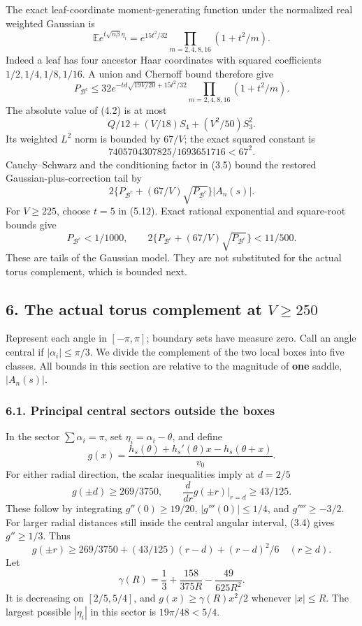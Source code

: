 \documentclass[
  11pt,
]{article}
\begin{document}
The exact leaf-coordinate moment-generating function under the
normalized real weighted Gaussian is \[
 \mathbb E e^{t\sqrt{n\beta}\eta_i}
 =e^{15t^2/32}\prod_{m=2,4,8,16}(1+t^2/m).                    \tag{5.11}
\] Indeed a leaf has four ancestor Haar coordinates with squared
coefficients \(1/2,1/4,1/8,1/16\). A union and Chernoff bound therefore
give \[
 P_{\mathcal B^c}\le32
 e^{-td\sqrt{19V/20}+15t^2/32}
 \prod_{m=2,4,8,16}(1+t^2/m).                                \tag{5.12}
\] The absolute value of (4.2) is at most \[
 Q/12+(V/18)S_4+(V^2/50)S_3^2.
\] Its weighted \(L^2\) norm is bounded by \(67/V\); the exact squared
constant is \[7405704307825/1693651716<67^2.\] Cauchy--Schwarz and the
conditioning factor in (3.5) bound the restored Gaussian-plus-correction
tail by \[
 2\{P_{\mathcal B^c}+(67/V)\sqrt{P_{\mathcal B^c}}\}|A_n(s)|.
\] For \(V\ge225\), choose \(t=5\) in (5.12). Exact rational exponential
and square-root bounds give \[
 P_{\mathcal B^c}<1/1000,\qquad
 2\{P_{\mathcal B^c}+(67/V)\sqrt{P_{\mathcal B^c}}\}<11/500.
                                                               \tag{5.13}
\] These are tails of the Gaussian model. They are not substituted for
the actual torus complement, which is bounded next.

\subsection{\texorpdfstring{6. The actual torus complement at
\(V\ge250\)}{6. The actual torus complement at V\textbackslash ge250}}\label{the-actual-torus-complement-at-vge250}

Represent each angle in \([-\pi,\pi]\); boundary sets have measure zero.
Call an angle central if \(|\alpha_i|\le\pi/3\). We divide the
complement of the two local boxes into five classes. All bounds in this
section are relative to the magnitude of \textbf{one} saddle,
\(|A_n(s)|\).

\subsubsection{6.1. Principal central sectors outside the
boxes}\label{principal-central-sectors-outside-the-boxes}

In the sector \(\sum\alpha_i=\pi\), set \(\eta_i=\alpha_i-\theta\), and
define \[
 g(x)=\frac{h_s(\theta)+h_s'(\theta)x-h_s(\theta+x)}{v_0}.
\] For either radial direction, the scalar inequalities imply at
\(d=2/5\) \[
 g(\pm d)\ge269/3750,\qquad
 \frac d{dr}g(\pm r)\big|_{r=d}\ge43/125.
\] These follow by integrating \(g''(0)\ge19/20\), \(|g'''(0)|\le1/4\),
and \(g''''\ge-3/2\). For larger radial distances still inside the
central angular interval, (3.4) gives \(g''\ge1/3\). Thus \[
 g(\pm r)\ge269/3750+(43/125)(r-d)+(r-d)^2/6\quad(r\ge d).
\] Let \[
 \gamma(R)=\frac13+\frac{158}{375R}-\frac{49}{625R^2}.
\] It is decreasing on \([2/5,5/4]\), and \(g(x)\ge\gamma(R)x^2/2\)
whenever \(|x|\le R\). The largest possible \(|\eta_i|\) in this sector
is \(19\pi/48<5/4\).
\end{document}
